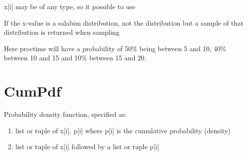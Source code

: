 \documentclass[letterpaper,10pt,english]{sphinxmanual}
\begin{document}
x{[}i{]} may be of any type, so it possible to use

\begin{sphinxVerbatim}[commandchars=\\\{\}]
       
  
\end{sphinxVerbatim}

If the x-value is a salabim distribution, not the distribution but a sample of that distribution is returned when sampling

\begin{sphinxVerbatim}[commandchars=\\\{\}]
          
\end{sphinxVerbatim}

Here proctime will have a probability of 50\% being between 5 and 10, 40\% between 10 and 15 and 10\% between 15 and 20.


\section{CumPdf}
\label{\detokenize{Distributions:cumpdf}}
Probability density function, specified as:
\begin{enumerate}
\item {} 
list or tuple of x{[}i{]}, p{[}i{]} where p{[}i{]} is the cumulative probability (density)

\item {} 
list or tuple of x{[}i{]} followed by a list or tuple p{[}i{]}

\end{enumerate}
\end{document}
